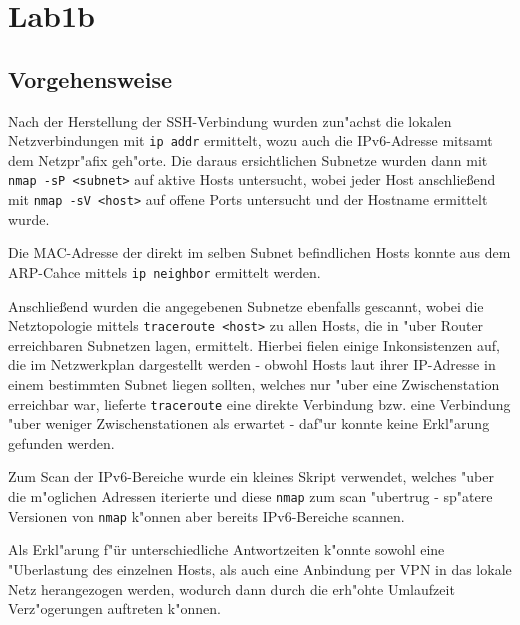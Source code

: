 \documentclass[12pt,a4paper,titlepage,oneside]{scrartcl}
\begin{document}
\section{Lab1b}

\subsection{Vorgehensweise}
Nach der Herstellung der SSH-Verbindung wurden zun"achst die lokalen Netzverbindungen mit \texttt{ip addr} ermittelt, wozu auch die IPv6-Adresse mitsamt dem Netzpr"afix geh"orte. Die daraus ersichtlichen Subnetze wurden dann mit \texttt{nmap -sP <subnet>} auf aktive Hosts untersucht, wobei jeder Host anschließend mit \texttt{nmap -sV <host>} auf offene Ports untersucht und der Hostname ermittelt wurde.

Die MAC-Adresse der direkt im selben Subnet befindlichen Hosts konnte aus dem ARP-Cahce mittels \texttt{ip neighbor} ermittelt werden.

Anschließend wurden die angegebenen Subnetze ebenfalls gescannt, wobei die Netztopologie mittels \texttt{traceroute <host>} zu allen Hosts, die in "uber Router erreichbaren Subnetzen lagen, ermittelt. Hierbei fielen einige Inkonsistenzen auf, die im Netzwerkplan dargestellt werden - obwohl Hosts laut ihrer IP-Adresse in einem bestimmten Subnet liegen sollten, welches nur "uber eine Zwischenstation erreichbar war, lieferte \texttt{traceroute} eine direkte Verbindung bzw. eine Verbindung "uber weniger Zwischenstationen als erwartet - daf"ur konnte keine Erkl"arung gefunden werden.

Zum Scan der IPv6-Bereiche wurde ein kleines Skript verwendet, welches "uber die m"oglichen Adressen iterierte und diese \texttt{nmap} zum scan "ubertrug - sp"atere Versionen von \texttt{nmap} k"onnen aber bereits IPv6-Bereiche scannen.

Als Erkl"arung f"ür unterschiedliche Antwortzeiten k"onnte sowohl eine "Uberlastung des einzelnen Hosts, als auch eine Anbindung per VPN in das lokale Netz herangezogen werden, wodurch dann durch die erh"ohte Umlaufzeit Verz"ogerungen auftreten k"onnen.
\end{document}

